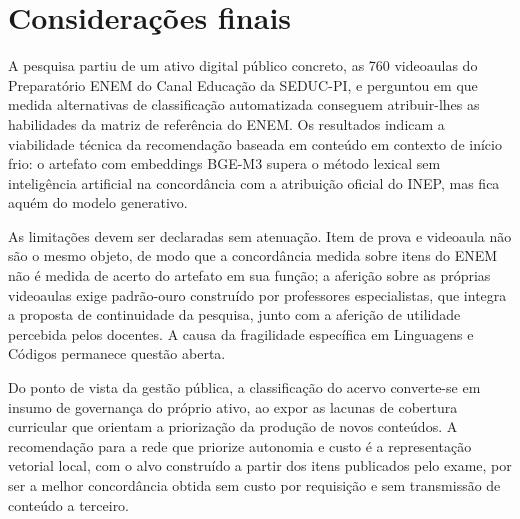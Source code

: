 
\section{Considerações finais}

A pesquisa partiu de um ativo digital público concreto, as 760 videoaulas do
Preparatório ENEM do Canal Educação da SEDUC-PI, e perguntou em que medida
alternativas de classificação automatizada conseguem atribuir-lhes as
habilidades da matriz de referência do ENEM. Os resultados indicam a
viabilidade técnica da recomendação baseada em conteúdo em contexto de início
frio: o artefato com embeddings BGE-M3 supera o método lexical sem inteligência
artificial na concordância com a atribuição oficial do INEP, mas fica aquém do
modelo generativo.

As limitações devem ser declaradas sem atenuação. Item de prova e videoaula não
são o mesmo objeto, de modo que a concordância medida sobre itens do ENEM não é
medida de acerto do artefato em sua função; a aferição sobre as próprias
videoaulas exige padrão-ouro construído por professores especialistas, que
integra a proposta de continuidade da pesquisa, junto com a aferição de
utilidade percebida pelos docentes. A causa da fragilidade específica em
Linguagens e Códigos permanece questão aberta.

Do ponto de vista da gestão pública, a classificação do acervo converte-se em
insumo de governança do próprio ativo, ao expor as lacunas de cobertura
curricular que orientam a priorização da produção de novos conteúdos. A
recomendação para a rede que priorize autonomia e custo é a representação
vetorial local, com o alvo construído a partir dos itens publicados pelo exame,
por ser a melhor concordância obtida sem custo por requisição e sem transmissão
de conteúdo a terceiro.
